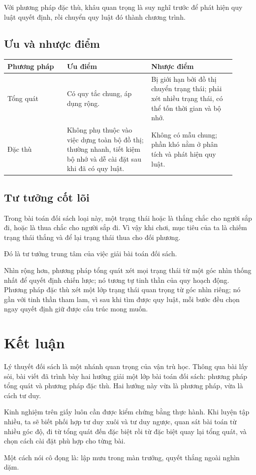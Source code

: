\documentclass[11pt]{article}
\begin{document}
Với phương pháp đặc thù, khâu quan trọng là suy nghĩ trước để phát hiện quy
luật quyết định, rồi chuyển quy luật đó thành chương trình.

\subsection{Ưu và nhược điểm}

\begin{center}
\begin{tabular}{p{0.24\linewidth}|p{0.34\linewidth}|p{0.34\linewidth}}
\textbf{Phương pháp} & \textbf{Ưu điểm} & \textbf{Nhược điểm}\\ \hline
Tổng quát &
Có quy tắc chung, áp dụng rộng. &
Bị giới hạn bởi đồ thị chuyển trạng thái; phải xét nhiều trạng thái, có thể
tốn thời gian và bộ nhớ.\\[0.4em]
Đặc thù &
Không phụ thuộc vào việc dựng toàn bộ đồ thị; thường nhanh, tiết kiệm bộ nhớ
và dễ cài đặt sau khi đã có quy luật. &
Không có mẫu chung; phần khó nằm ở phân tích và phát hiện quy luật.
\end{tabular}
\end{center}

\subsection{Tư tưởng cốt lõi}

Trong bài toán đối sách loại này, một trạng thái hoặc là thắng chắc cho người
sắp đi, hoặc là thua chắc cho người sắp đi. Vì vậy khi chơi, mục tiêu của ta
là chiếm trạng thái thắng và để lại trạng thái thua cho đối phương.

Đó là tư tưởng trung tâm của việc giải bài toán đối sách.

Nhìn rộng hơn, phương pháp tổng quát xét mọi trạng thái từ một góc nhìn thống
nhất để quyết định chiến lược; nó tương tự tinh thần của quy hoạch động.
Phương pháp đặc thù xét một lớp trạng thái quan trọng từ góc nhìn riêng; nó
gần với tinh thần tham lam, vì sau khi tìm được quy luật, mỗi bước đều chọn
ngay quyết định giữ được cấu trúc mong muốn.

\section{Kết luận}

Lý thuyết đối sách là một nhánh quan trọng của vận trù học. Thông qua bài lấy
sỏi, bài viết đã trình bày hai hướng giải một lớp bài toán đối sách: phương
pháp tổng quát và phương pháp đặc thù. Hai hướng này vừa là phương pháp, vừa
là cách tư duy.

Kinh nghiệm trên giấy luôn cần được kiểm chứng bằng thực hành. Khi luyện tập
nhiều, ta sẽ biết phối hợp tư duy xuôi và tư duy ngược, quan sát bài toán từ
nhiều góc độ, đi từ tổng quát đến đặc biệt rồi từ đặc biệt quay lại tổng
quát, và chọn cách cài đặt phù hợp cho từng bài.

Một cách nói cô đọng là: lập mưu trong màn trướng, quyết thắng ngoài nghìn
dặm.
\end{document}
